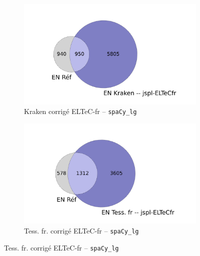\begin{figure}[h!]
\begin{minipage}{7cm}
  \begin{subfigure}{1\textwidth}
  \includegraphics[width=1\textwidth]{IMAGES/INTERSECTIONS_GLOBALES/ELTeCFRA_Kraken -- jspl-ELTeCfr_spacy-lg-concat_intersection.png} 
  \caption{Kraken corrigé ELTeC-fr -- \texttt{spaCy\_lg}}
  \label{fig:ELTeCFRA_Kraken -- jspl-ELTeCfr_spacy-lg-concat_intersection}
  \end{subfigure}
  \end{minipage}
  \begin{minipage}{7cm}
  \begin{subfigure}{1\textwidth}
  \includegraphics[width=1\textwidth]{IMAGES/INTERSECTIONS_GLOBALES/ELTeCFRA_Tess. fr -- jspl-ELTeCfr_spacy-lg-concat_intersection.png} %
  \caption{Tess. fr. corrigé ELTeC-fr -- \texttt{spaCy\_lg}}
  \label{fig:ELTeCFRA_Tess -- jspl-ELTeCFR_spacy-lg-concat_intersection}
  \end{subfigure}
    \end{minipage}

\end{figure}
